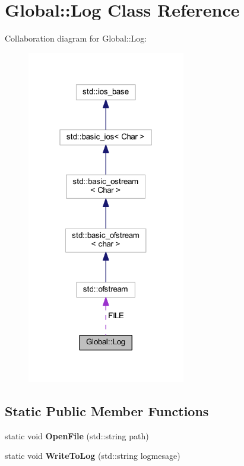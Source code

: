 \hypertarget{class_global_1_1_log}{}\section{Global\+:\+:Log Class Reference}
\label{class_global_1_1_log}


Collaboration diagram for Global\+:\+:Log\+:
\nopagebreak
\begin{figure}[H]
\begin{center}
\leavevmode
\includegraphics[width=196pt]{class_global_1_1_log__coll__graph}
\end{center}
\end{figure}
\subsection*{Static Public Member Functions}
\begin{DoxyCompactItemize}
\item 
static void {\bfseries Open\+File} (std\+::string path)\hypertarget{class_global_1_1_log_a63f278746c40bc6f60f12ea6bd946e8f}{}\label{class_global_1_1_log_a63f278746c40bc6f60f12ea6bd946e8f}

\item 
static void {\bfseries Write\+To\+Log} (std\+::string logmesage)\hypertarget{class_global_1_1_log_a852c7254c3c470333788b817d52ee43a}{}\label{class_global_1_1_log_a852c7254c3c470333788b817d52ee43a}

\end{DoxyCompactItemize}
